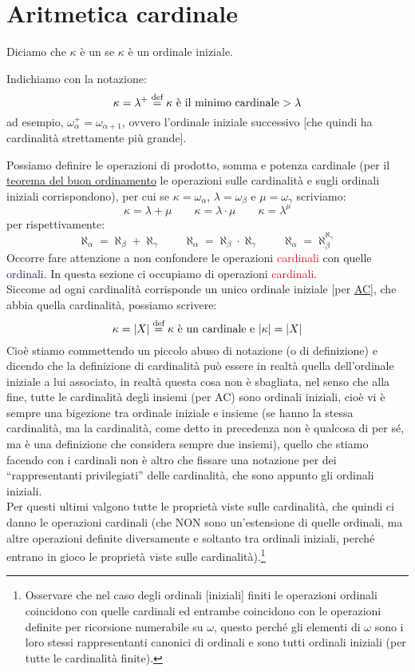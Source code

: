 \section{Aritmetica cardinale}

\begin{definition}[Cardinali]
	Diciamo che $\kappa$ è un  se $\kappa$ è un ordinale iniziale.
\end{definition}

\begin{notation}
	Indichiamo con la notazione:
	\[ \kappa = \lambda^+ \overset{\text{def}}{=} \text{$\kappa$ è il minimo cardinale $>\lambda$}
		\]
	ad esempio, $\omega_\alpha^+ = \omega_{\alpha + 1}$, ovvero l'ordinale iniziale successivo [che quindi ha cardinalità strettamente più grande].
\end{notation}

Possiamo definire le operazioni di prodotto, somma e potenza cardinale (per il \hyperref[buon_ordinamento]{teorema del buon ordinamento} le operazioni sulle cardinalità e sugli ordinali iniziali corrispondono), per cui se $\kappa = \omega_\alpha$, $\lambda = \omega_\beta$ e $\mu = \omega_\gamma$ scriviamo:
\[ \kappa =  \lambda + \mu \qquad \kappa = \lambda \cdot \mu \qquad \kappa = \lambda^\mu
	\]
per rispettivamente:
\[ \aleph_\alpha = \aleph_\beta + \aleph_\gamma \qquad \aleph_\alpha = \aleph_\beta \cdot \aleph_\gamma \qquad \aleph_\alpha = \aleph_\beta^{\aleph_\gamma}
	\]
Occorre fare attenzione a non confondere le operazioni \textcolor{red}{cardinali} con quelle \textcolor{MidnightBlue}{ordinali}. In questa sezione ci occupiamo di operazioni \textcolor{red}{cardinali}.\\
Siccome ad ogni cardinalità corrisponde un unico ordinale iniziale [per \hyperref[ax9]{AC}], che abbia quella cardinalità, possiamo scrivere:
\[ \kappa = |X| \overset{\text{def}}{=} \text{$\kappa$ è un cardinale e $|\kappa| = |X|$}
	\]
Cioè stiamo commettendo un piccolo abuso di notazione (o di definizione) e dicendo che la definizione di cardinalità può essere in realtà quella dell'ordinale iniziale a lui associato, in realtà questa cosa non è sbagliata, nel senso che alla fine, tutte le cardinalità degli insiemi (per AC) sono ordinali iniziali, cioè vi è sempre una bigezione tra ordinale iniziale e insieme (se hanno la stessa cardinalità, ma la cardinalità, come detto in precedenza non è qualcosa di per sé, ma è una definizione che 
considera sempre due insiemi), quello che stiamo facendo con i cardinali non è altro che fissare una notazione per dei ``rappresentanti privilegiati'' delle cardinalità, che sono appunto gli ordinali iniziali.\\
Per questi ultimi valgono tutte le proprietà viste sulle cardinalità, che quindi ci danno le operazioni cardinali (che NON sono un'estensione di quelle ordinali, ma altre operazioni definite diversamente e soltanto tra ordinali iniziali, perché entrano in gioco le proprietà viste sulle cardinalità).\footnote{Osservare che nel caso degli ordinali [iniziali] finiti le operazioni ordinali coincidono con quelle cardinali ed entrambe coincidono con le operazioni definite per ricorsione numerabile su $\omega$, questo 
perché gli elementi di $\omega$ sono i loro stessi rappresentanti canonici di ordinali e sono tutti ordinali iniziali (per tutte le cardinalità finite).}
